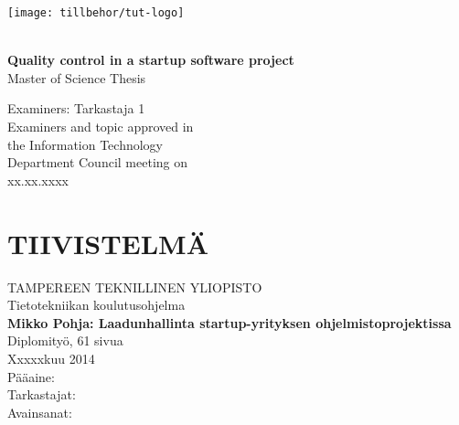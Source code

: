  
\thispagestyle{empty}
 
\vspace*{-.5cm}\noindent
 
 
\texttt{[image: tillbehor/tut-logo]}
 
\vspace{6.8cm}
 
\\
{\bf\large \textsf{Quality control in a startup software project}}\\
\textsf{Master of Science Thesis}
 
\vspace{8.7cm} %
 
\begin{flushright}
  
\begin{minipage}[c]{6.8cm}
\begin{spacing}{1.0}
\textsf{Examiners: Tarkastaja 1}\\
\textsf{Examiners and topic approved in}\\ 
\textsf{the Information Technology}\\
\textsf{Department Council meeting on}\\
\textsf{xx.xx.xxxx}\\
\end{spacing}
\end{minipage}
\end{flushright}
 
\newpage
 
\setcounter{page}{1} %
 
\chapter*{TIIVISTELMÄ}
\begin{spacing}{1.0}
\textsf{TAMPEREEN TEKNILLINEN YLIOPISTO}\\
\textsf{Tietotekniikan koulutusohjelma}\\
{\bf \textsf{Mikko Pohja: Laadunhallinta startup-yrityksen ohjelmistoprojektissa}}\\
\textsf{Diplomityö, 61 sivua}\\
\textsf{Xxxxxkuu 2014}\\
\textsf{Pääaine: }\\
\textsf{Tarkastajat: }\\
\textsf{Avainsanat: }\\
\end{spacing}
 
